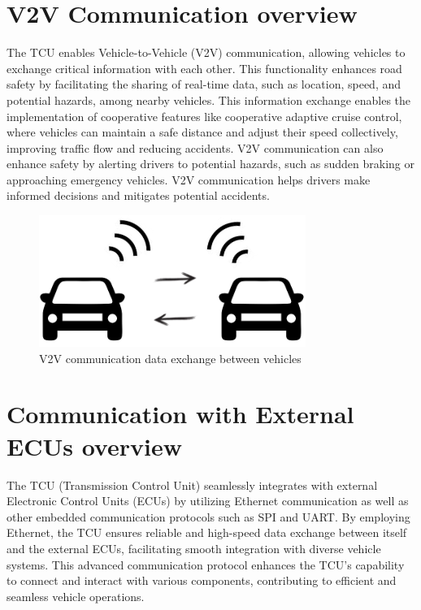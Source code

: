 \documentclass[
12pt,
oneside, 
onehalfspacing, 
nolistspacing, 
parskip, 
chapterinoneline, 
]{AASTCOMPUTER}
\begin{document}
\section{V2V Communication overview}
The TCU enables Vehicle-to-Vehicle \cite{biswas2006vehicle} (V2V) communication, allowing vehicles to exchange critical information with each other. This functionality enhances road safety by facilitating the sharing of real-time data, such as location, speed, and potential hazards, among nearby vehicles. This information exchange enables the implementation of cooperative features like cooperative adaptive cruise control, where vehicles can maintain a safe distance and adjust their speed collectively, improving traffic flow and reducing accidents. V2V communication can also enhance safety by alerting drivers to potential hazards, such as sudden braking or approaching emergency vehicles. V2V communication helps drivers make informed decisions and mitigates potential accidents.

\begin{figure}[!ht]
\centering
\includegraphics[scale=0.5]{Figures/V2V communication data exchange between vehicles.png}
\caption[V2V Communication overview]{V2V communication data exchange between vehicles}
\label{fig:V2V communication data exchange between vehicles}
\end{figure}
 


\section{Communication with External ECUs overview}
The TCU (Transmission Control Unit) seamlessly integrates with external Electronic Control Units (ECUs) by utilizing Ethernet communication as well as other embedded communication protocols such as SPI and UART. By employing Ethernet, the TCU ensures reliable and high-speed data exchange between itself and the external ECUs, facilitating smooth integration with diverse vehicle systems. This advanced communication protocol enhances the TCU's capability to connect and interact with various components, contributing to efficient and seamless vehicle operations.
\end{document}

